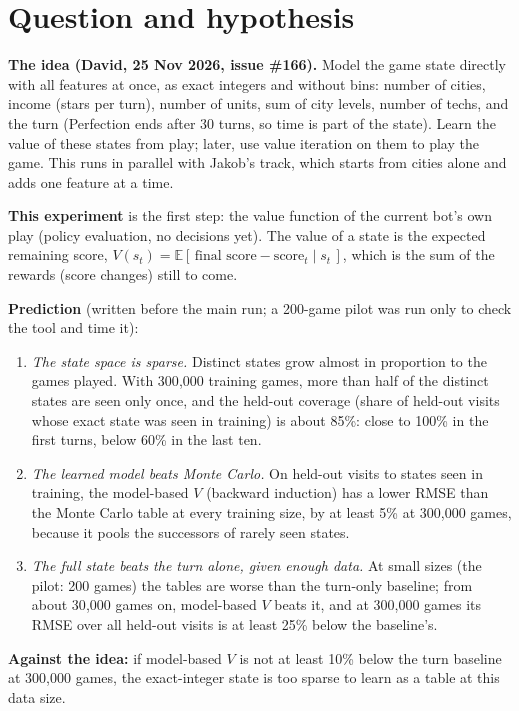 \documentclass{../polyexp}
\begin{document}

\ExpHeader

\section{Question and hypothesis}
\textbf{The idea (David, 25 Nov 2026, issue \#166).} Model the game state directly with all features at once,
as exact integers and without bins: number of cities, income (stars per turn), number of units, sum of city
levels, number of techs, and the turn (Perfection ends after 30 turns, so time is part of the state). Learn the
value of these states from play; later, use value iteration on them to play the game. This runs in parallel
with Jakob's track, which starts from cities alone and adds one feature at a time.

\textbf{This experiment} is the first step: the value function of the current bot's own play (policy
evaluation, no decisions yet). The value of a state is the expected remaining score,
$V(s_t) = \mathbb{E}[\,\text{final score} - \text{score}_t \mid s_t\,]$, which is the sum of the rewards
(score changes) still to come.

\textbf{Prediction} (written before the main run; a 200-game pilot was run only to check the tool and time it):
\begin{enumerate}
  \item \emph{The state space is sparse.} Distinct states grow almost in proportion to the games played. With
        300{,}000 training games, more than half of the distinct states are seen only once, and the held-out
        coverage (share of held-out visits whose exact state was seen in training) is about 85\%: close to
        100\% in the first turns, below 60\% in the last ten.
  \item \emph{The learned model beats Monte Carlo.} On held-out visits to states seen in training, the
        model-based $V$ (backward induction) has a lower RMSE than the Monte Carlo table at every training size,
        by at least 5\% at 300{,}000 games, because it pools the successors of rarely seen states.
  \item \emph{The full state beats the turn alone, given enough data.} At small sizes (the pilot: 200 games) the
        tables are worse than the turn-only baseline; from about 30{,}000 games on, model-based $V$ beats it,
        and at 300{,}000 games its RMSE over all held-out visits is at least 25\% below the baseline's.
\end{enumerate}
\textbf{Against the idea:} if model-based $V$ is not at least 10\% below the turn baseline at 300{,}000 games,
the exact-integer state is too sparse to learn as a table at this data size.
\end{document}
